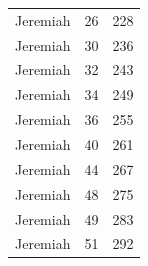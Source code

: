 \documentclass{article}
\newlength{\minipageheight}
\newlength{\minipagewidth}
\begin{document}
\begin{minipage}[r][\minipageheight][t]{\minipagewidth}
\begin{center}
\begin{tabular}{|c|c|c|}
            Jeremiah & 26      & 228       \\
            Jeremiah & 30      & 236       \\
            Jeremiah & 32      & 243       \\
            Jeremiah & 34      & 249       \\
            Jeremiah & 36      & 255       \\
            Jeremiah & 40      & 261       \\
            Jeremiah & 44      & 267       \\
            Jeremiah & 48      & 275       \\
            Jeremiah & 49      & 283       \\
            Jeremiah & 51      & 292       \\
            \hline
        \end{tabular}
    \end{center}
\end{minipage}%


\end{document}
